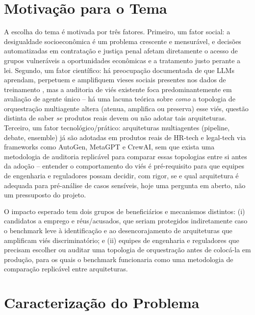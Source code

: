 \documentclass[12pt]{article}
\begin{document}
\section{Motivação para o Tema}
\label{sec:motivacao}

A escolha do tema é motivada por três fatores. Primeiro, um fator social: a desigualdade socioeconômica é um problema crescente e mensurável, e decisões automatizadas em contratação e justiça penal afetam diretamente o acesso de grupos vulneráveis a oportunidades econômicas e a tratamento justo perante a lei. Segundo, um fator científico: há preocupação documentada de que LLMs aprendam, perpetuem e amplifiquem vieses sociais presentes nos dados de treinamento \citep{gallegos2024bias}, mas a auditoria de viés existente foca predominantemente em avaliação de agente único -- há uma lacuna teórica sobre \emph{como} a topologia de orquestração multiagente altera (atenua, amplifica ou preserva) esse viés, questão distinta de saber \emph{se} produtos reais devem ou não adotar tais arquiteturas. Terceiro, um fator tecnológico/prático: arquiteturas multiagentes (pipeline, debate, ensemble) já são adotadas em produtos reais de HR-tech e legal-tech via frameworks como AutoGen, MetaGPT e CrewAI, sem que exista uma metodologia de auditoria replicável para comparar essas topologias entre si antes da adoção -- entender o comportamento do viés é pré-requisito para que equipes de engenharia e reguladores possam decidir, com rigor, se e qual arquitetura é adequada para pré-análise de casos sensíveis, hoje uma pergunta em aberto, não um pressuposto do projeto.

O impacto esperado tem dois grupos de beneficiários e mecanismos distintos: (i) candidatos a emprego e réus/acusados, que seriam protegidos indiretamente caso o benchmark leve à identificação e ao desencorajamento de arquiteturas que amplificam viés discriminatório; e (ii) equipes de engenharia e reguladores que precisam escolher ou auditar uma topologia de orquestração antes de colocá-la em produção, para os quais o benchmark funcionaria como uma metodologia de comparação replicável entre arquiteturas.


\section{Caracterização do Problema}
\label{sec:problema}
\end{document}

